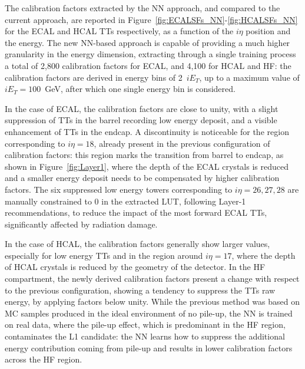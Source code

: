 The calibration factors extracted by the NN approach, and compared to the current approach, are reported in Figure~\ref{fig:ECALSFs_NN}-\ref{fig:HCALSFs_NN} for the ECAL and HCAL TTs respectively, as a function of the $i\eta$ position and the energy.
The new NN-based approach is capable of providing a much higher granularity in the energy dimension, extracting through a single training process a total of 2,800 calibration factors for ECAL, and 4,100 for HCAL and HF: the calibration factors are derived in energy bins of 2~$iE_T$, up to a maximum value of $iE_T=100$~GeV, after which one single energy bin is considered. 

In the case of ECAL, the calibration factors are close to unity, with a slight suppression of TTs in the barrel recording low energy deposit, and a visible enhancement of TTs in the endcap. A discontinuity is noticeable for the region corresponding to $i\eta=18$, already present in the previous configuration of calibration factors: this region marks the transition from barrel to endcap, as shown in Figure~\ref{fig:Layer1}, where the depth of the ECAL crystals is reduced and a smaller energy deposit needs to be compensated by higher calibration factors. The six suppressed low energy towers corresponding to $i\eta=26,27,28$ are manually constrained to 0 in the extracted LUT, following Layer-1 recommendations, to reduce the impact of the most forward ECAL TTs, significantly affected by radiation damage.

In the case of HCAL, the calibration factors generally show larger values, especially for low energy TTs and in the region around $i\eta=17$, where the depth of HCAL crystals is reduced by the geometry of the detector. In the HF compartment, the newly derived calibration factors 
present a change with respect to the previous configuration, showing a tendency to suppress the TTs raw energy, by applying factors below unity. While the previous method was based on MC samples produced in the ideal environment of no pile-up, the NN is trained on real data, where the pile-up effect, which is predominant in the HF region, contaminates the L1 candidate: the NN learns how to suppress the additional energy contribution coming from pile-up and results in lower calibration factors across the HF region.

\bigbreak

